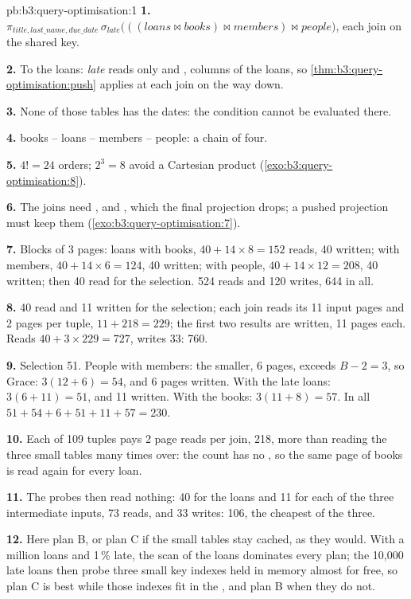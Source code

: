 \begin{solution}{pb:b3:query-optimisation:1}
\textbf{1.} $\pi_{\mathit{title}, \mathit{last\_name}, \mathit{due\_date}}\, \sigma_{\mathit{late}}\bigl(((\mathit{loans} \bowtie \mathit{books}) \bowtie \mathit{members}) \bowtie \mathit{people}\bigr)$, each join on the shared key.

\textbf{2.} To the loans: \emph{late} reads only  and , columns of the loans, so \cref{thm:b3:query-optimisation:push} applies at each join on the way down.

\textbf{3.} None of those tables has the dates: the condition cannot be evaluated there.

\textbf{4.} books -- loans -- members -- people: a chain of four.

\textbf{5.} $4! = 24$ orders; $2^3 = 8$ avoid a Cartesian product (\cref{exo:b3:query-optimisation:8}).

\textbf{6.} The joins need ,  and , which the final projection drops; a pushed projection must keep them (\cref{exo:b3:query-optimisation:7}).

\textbf{7.} Blocks of 3 pages: loans with books, $40 + 14 \times 8 = 152$ reads, 40 written; with members, $40 + 14 \times 6 = 124$, 40 written; with people, $40 + 14 \times 12 = 208$, 40 written; then 40 read for the selection. 524 reads and 120 writes, 644 in all.

\textbf{8.} 40 read and 11 written for the selection; each join reads its 11 input pages and 2 pages per tuple, $11 + 218 = 229$; the first two results are written, 11 pages each. Reads $40 + 3 \times 229 = 727$, writes 33: 760.

\textbf{9.} Selection 51. People with members: the smaller, 6 pages, exceeds $B - 2 = 3$, so Grace: $3(12 + 6) = 54$, and 6 pages written. With the late loans: $3(6 + 11) = 51$, and 11 written. With the books: $3(11 + 8) = 57$. In all $51 + 54 + 6 + 51 + 11 + 57 = 230$.

\textbf{10.} Each of 109 tuples pays 2 page reads per join, 218, more than reading the three small tables many times over: the count has no , so the same page of books is read again for every loan.

\textbf{11.} The probes then read nothing: 40 for the loans and 11 for each of the three intermediate inputs, 73 reads, and 33 writes: 106, the cheapest of the three.

\textbf{12.} Here plan B, or plan C if the small tables stay cached, as they would. With a million loans and 1\,\% late, the scan of the loans dominates every plan; the 10,000 late loans then probe three small key indexes held in memory almost for free, so plan C is best while those indexes fit in the , and plan B when they do not.


\end{solution}
